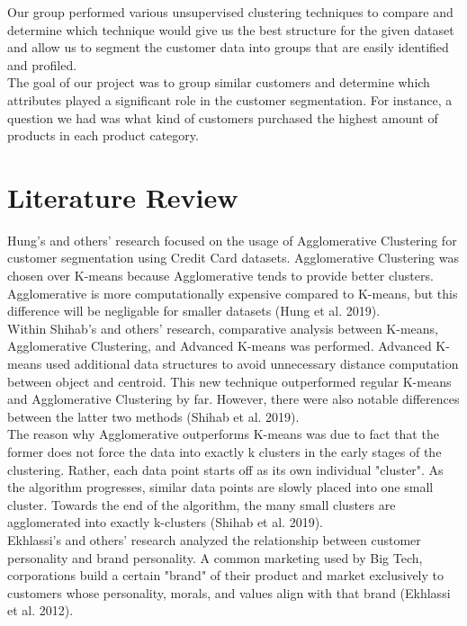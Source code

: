 \documentclass[12pt]{article}
\begin{document}
\noindent Our group performed various unsupervised clustering techniques to compare and determine which technique would give us the best structure for the given dataset and allow us to segment the customer data into groups that are easily identified and profiled.\\

\noindent The goal of our project was to group similar customers and determine which attributes played a significant role in the customer segmentation. For instance, a question we had was what kind of customers purchased the highest amount of products in each product category.\\

\section{Literature Review}
Hung's and others' research focused on the usage of Agglomerative Clustering for customer segmentation using Credit Card datasets. Agglomerative Clustering was chosen over K-means because Agglomerative tends to provide better clusters. Agglomerative is more computationally expensive compared to K-means, but this difference will be negligable for smaller datasets  (Hung et al. 2019).\\

\noindent Within Shihab's and others' research, comparative analysis between K-means, Agglomerative Clustering, and Advanced K-means was performed. Advanced K-means used additional data structures to avoid unnecessary distance computation between object and centroid. This new technique outperformed regular K-means and Agglomerative Clustering by far. However, there were also notable differences between the latter two methods (Shihab et al. 2019).\\

\noindent The reason why Agglomerative outperforms K-means was due to fact that the former does not force the data into exactly k clusters in the early stages of the clustering. Rather, each data point starts off as its own individual "cluster". As the algorithm progresses, similar data points are slowly placed into one small cluster. Towards the end of the algorithm, the  many small clusters are agglomerated into exactly k-clusters (Shihab et al. 2019).\\


\noindent Ekhlassi's and others' research analyzed the relationship between customer personality and brand personality. A common marketing used by Big Tech, corporations build a certain "brand" of their product and market exclusively to customers whose personality, morals, and values align with that brand (Ekhlassi et al. 2012).\\
\end{document}
